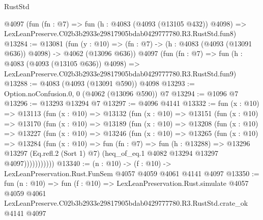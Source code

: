 \begin{lexlean}{RustStd}
\begin{coremodule}
    @4097
    (fun (fn : @7) =>
    fun (h : @4083 (@4093 (@13105 @432)) @4098) =>
    LexLeanPreserve.C02b3b2933e29817905bdab0429777780.R3.RustStd.fun8)
@13284 := @13081
    (fun (y : @10) => (fn : @7) -> (h : @4083 (@4093 (@13091 @636)) @4098) -> @4062 (@13096 @636))
    @4097
    (fun (fn : @7) =>
    fun (h : @4083 (@4093 (@13105 @636)) @4098) =>
    LexLeanPreserve.C02b3b2933e29817905bdab0429777780.R3.RustStd.fun9)
@13288 := @4083 (@4093 (@13091 @590)) @4098
@13293 := Option.noConfusion.{0, 0} (@4062 (@13096 @590)) @7
@13294 := @1096 @7
@13296 := @13293 @13294 @7
@13297 := @4096 @4141
@13332 := fun (x : @10) =>
  @13113
    (fun (x : @10) =>
    @13132
      (fun (x : @10) =>
      @13151
        (fun (x : @10) =>
        @13170
          (fun (x : @10) =>
          @13189
            (fun (x : @10) =>
            @13208
              (fun (x : @10) =>
              @13227
                (fun (x : @10) =>
                @13246
                  (fun (x : @10) =>
                  @13265
                    (fun (x : @10) =>
                    @13284
                      (fun (x : @10) =>
                      fun (fn : @7) =>
                      fun (h : @13288) =>
                      @13296
                        @13297
                        (Eq.refl.{2} (Sort 1) @7)
                        (heq_of_eq.{1} @4082 @13294 @13297 @4097)))))))))))
@13340 := (n : @10) -> (f : @10) -> LexLeanPreservation.Rust.FunSem @4057 @4059 @4061 @4141 @4097
@13350 := fun (n : @10) =>
  fun (f : @10) =>
  LexLeanPreservation.Rust.simulate
    @4057
    @4059
    @4061
    LexLeanPreserve.C02b3b2933e29817905bdab0429777780.R3.RustStd.crate_ok
    @4141
    @4097
\end{coremodule}
\end{lexlean}
